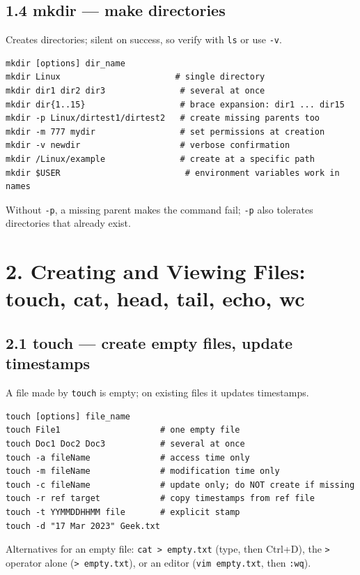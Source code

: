 \documentclass[11pt,a4paper]{article}
\newcommand{\cmd}[1]{\texttt{#1}}
\begin{document}
\subsection{1.4 mkdir --- make directories}
Creates directories; silent on success, so verify with \cmd{ls} or use \cmd{-v}.
\begin{lstlisting}
mkdir [options] dir_name
mkdir Linux                       # single directory
mkdir dir1 dir2 dir3               # several at once
mkdir dir{1..15}                   # brace expansion: dir1 ... dir15
mkdir -p Linux/dirtest1/dirtest2   # create missing parents too
mkdir -m 777 mydir                 # set permissions at creation
mkdir -v newdir                    # verbose confirmation
mkdir /Linux/example               # create at a specific path
mkdir $USER                         # environment variables work in names
\end{lstlisting}
Without \cmd{-p}, a missing parent makes the command fail; \cmd{-p} also tolerates directories that already exist.

\section{2. Creating and Viewing Files: touch, cat, head, tail, echo, wc}

\subsection{2.1 touch --- create empty files, update timestamps}
A file made by \cmd{touch} is empty; on existing files it updates timestamps.
\begin{lstlisting}
touch [options] file_name
touch File1                    # one empty file
touch Doc1 Doc2 Doc3           # several at once
touch -a fileName              # access time only
touch -m fileName              # modification time only
touch -c fileName              # update only; do NOT create if missing
touch -r ref target            # copy timestamps from ref file
touch -t YYMMDDHHMM file       # explicit stamp
touch -d "17 Mar 2023" Geek.txt
\end{lstlisting}
Alternatives for an empty file: \cmd{cat > empty.txt} (type, then Ctrl+D), the \cmd{>} operator alone (\cmd{> empty.txt}), or an editor (\cmd{vim empty.txt}, then \cmd{:wq}).
\end{document}

